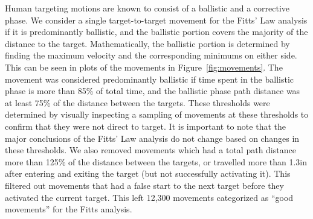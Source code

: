 \documentclass[]{aiaa-tc}%
\begin{document}
Human targeting motions are known to consist of a ballistic and a corrective phase\cite{woodworth_accuracy_1899}.
We consider a single target-to-target movement for the Fitts' Law analysis if it is predominantly ballistic, and the ballistic portion covers the majority of the distance to the target.
Mathematically, the ballistic portion is determined by finding the maximum velocity and the corresponding minimums on either side.
This can be seen in plots of the movements in Figure~\ref{fig:movements}.
The movement was considered predominantly ballistic if time spent in the ballistic phase is more than 85\% of total time, and the ballistic phase path distance was at least 75\% of the distance between the targets.
These thresholds were determined by visually inspecting a sampling of movements at these thresholds to confirm that they were not direct to target.
It is important to note that the major conclusions of the Fitts' Law analysis do not change based on changes in these thresholds.
We also removed movements which had a total path distance more than 125\% of the distance between the targets, or travelled more than 1.3in after entering and exiting the target (but not successfully activating it).
This filtered out movements that had a false start to the next target before they activated the current target.
This left 12,300 movements categorized as ``good movements'' for the Fitts analysis.
\end{document}
